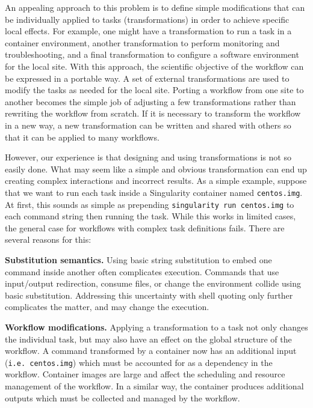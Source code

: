 \documentclass[conference]{IEEEtran}
\begin{document}
An appealing approach to this problem is to define 
simple modifications that can be individually applied to tasks
(transformations) in order
to achieve specific local effects.  For example, one might have a transformation
to run a task in a container environment, another transformation to perform monitoring
and troubleshooting, and a final transformation to configure a software environment
for the local site.  With this approach, the scientific objective of the workflow
can be expressed in a portable way. 
A set of external transformations are used to
modify the tasks as needed for the local site.  Porting a workflow from one site
to another becomes the simple job of adjusting a few transformations rather than
rewriting the workflow from scratch.  If it is necessary to transform
the workflow in a new way, a new transformation can be written and shared
with others so that it can be applied to many workflows.

However, our experience is that designing and using transformations
is not so easily done. What may seem like a simple and obvious
transformation can end up creating complex interactions and
incorrect results.  As a simple example, suppose that
we want to run each task inside a Singularity
container named {\tt centos.img}.
At first, this sounds
as simple as prepending {\tt singularity run centos.img} to each
command string then running the task.  While this 
works in limited cases, the general case for workflows
with complex task definitions fails.  There are several reasons for this:

    {\bf Substitution semantics.} 
    Using basic string substitution to embed one command 
    inside another often complicates execution.  
    Commands that use 
    input/output redirection,
    consume files,
    or change the environment 
    collide using basic substitution.
    Addressing this uncertainty with shell quoting only 
    further complicates the matter, and may
    change the execution.

        
    {\bf Workflow modifications.}
    Applying a transformation to a task not 
    only changes the individual task, 
    but may also have an effect on the 
    global structure of the workflow.  
    A command transformed by a container 
    now has an additional input ({\tt i.e. centos.img})
    which must be accounted for as a 
    dependency in the workflow.
    Container images are large and affect the 
    scheduling and resource management of the workflow.  
    In a similar way, the container produces additional 
    outputs which must be collected and managed by the
    workflow.
    
\end{document}
